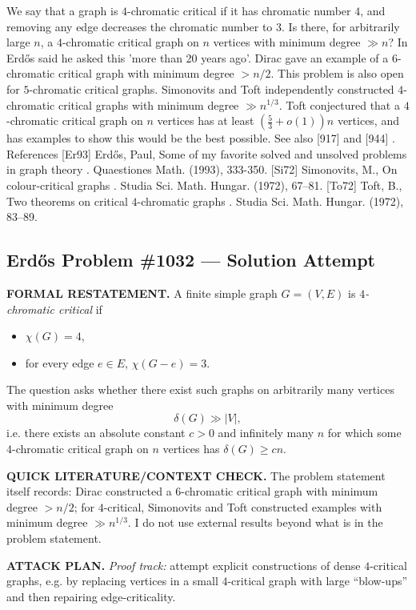 We say that a graph is $4$-chromatic critical if it has chromatic number $4$, and removing any edge decreases the chromatic number to $3$. Is there, for arbitrarily large $n$, a $4$-chromatic critical graph on $n$ vertices with minimum degree $\gg n$? In \cite{Er93} Erd\H{o}s said he asked this 'more than 20 years ago'. Dirac gave an example of a $6$-chromatic critical graph with minimum degree $>n/2$. This problem is also open for $5$-chromatic critical graphs. Simonovits \cite{Si72} and Toft \cite{To72} independently constructed $4$-chromatic critical graphs with minimum degree $\gg n^{1/3}$. Toft conjectured that a $4$-chromatic critical graph on $n$ vertices has at least $(\frac{5}{3}+o(1))n$ vertices, and has examples to show this would be the best possible. See also [917] and [944] . References [Er93] Erd\H{o}s, Paul, Some of my favorite solved and unsolved problems in graph theory . Quaestiones Math. (1993), 333-350. [Si72] Simonovits, M., On colour-critical graphs . Studia Sci. Math. Hungar. (1972), 67--81. [To72] Toft, B., Two theorems on critical {$4$}-chromatic graphs . Studia Sci. Math. Hungar. (1972), 83--89.

\subsection*{Erd\H{o}s Problem \#1032 --- Solution Attempt}

\textbf{FORMAL RESTATEMENT.}
A finite simple graph $G=(V,E)$ is \emph{$4$-chromatic critical} if
\begin{itemize}
\item $\chi(G)=4$,
\item for every edge $e\in E$, $\chi(G-e)=3$.
\end{itemize}
The question asks whether there exist such graphs on arbitrarily many vertices with minimum degree
\[\delta(G) \gg |V|,\]
i.e. there exists an absolute constant $c>0$ and infinitely many $n$ for which some $4$-chromatic critical graph on $n$ vertices has $\delta(G)\ge cn$.

\textbf{QUICK LITERATURE/CONTEXT CHECK.}
The problem statement itself records:
Dirac constructed a $6$-chromatic critical graph with minimum degree $>n/2$; for $4$-critical, Simonovits and Toft constructed examples with minimum degree $\gg n^{1/3}$.
I do not use external results beyond what is in the problem statement.

\textbf{ATTACK PLAN.}
\emph{Proof track:} attempt explicit constructions of dense $4$-critical graphs, e.g. by replacing vertices in a small $4$-critical graph with large ``blow-ups'' and then repairing edge-criticality.

